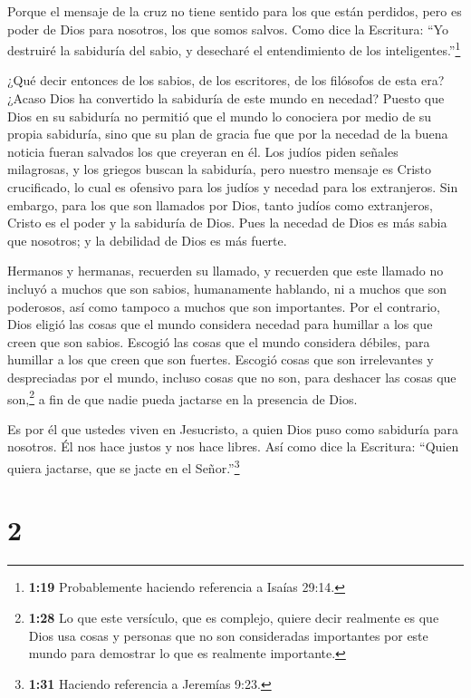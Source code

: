  Porque el mensaje de la cruz no tiene sentido para los que
están perdidos, pero es poder de Dios para nosotros, los que somos
salvos.  Como dice la Escritura: ``Yo destruiré la
sabiduría del sabio, y desecharé el entendimiento de los
inteligentes.''\footnote{\textbf{1:19} Probablemente haciendo referencia
  a Isaías 29:14.}

 ¿Qué decir entonces de los sabios, de los escritores, de
los filósofos de esta era?  ¿Acaso Dios ha convertido la
sabiduría de este mundo en necedad? Puesto que Dios en su sabiduría no
permitió que el mundo lo conociera por medio de su propia sabiduría,
sino que su plan de gracia fue que por la necedad de la buena noticia
fueran salvados los que creyeran en él.  Los judíos piden
señales milagrosas, y los griegos buscan la sabiduría, 
pero nuestro mensaje es Cristo crucificado, lo cual es ofensivo para los
judíos y necedad para los extranjeros.  Sin embargo, para
los que son llamados por Dios, tanto judíos como extranjeros, Cristo es
el poder y la sabiduría de Dios.  Pues la necedad de Dios
es más sabia que nosotros; y la debilidad de Dios es más fuerte.

 Hermanos y hermanas, recuerden su llamado, y recuerden que
este llamado no incluyó a muchos que son sabios, humanamente hablando,
ni a muchos que son poderosos, así como tampoco a muchos que son
importantes.  Por el contrario, Dios eligió las cosas que
el mundo considera necedad para humillar a los que creen que son sabios.
Escogió las cosas que el mundo considera débiles, para humillar a los
que creen que son fuertes.  Escogió cosas que son
irrelevantes y despreciadas por el mundo, incluso cosas que no son, para
deshacer las cosas que son,\footnote{\textbf{1:28} Lo que este
  versículo, que es complejo, quiere decir realmente es que Dios usa
  cosas y personas que no son consideradas importantes por este mundo
  para demostrar lo que es realmente importante.}  a fin de
que nadie pueda jactarse en la presencia de Dios.

 Es por él que ustedes viven en Jesucristo, a quien Dios
puso como sabiduría para nosotros. Él nos hace justos y nos hace libres.
 Así como dice la Escritura: ``Quien quiera jactarse, que
se jacte en el Señor.''\footnote{\textbf{1:31} Haciendo referencia a
  Jeremías 9:23.}

\hypertarget{section-1}{%
\section{2}\label{section-1}}

